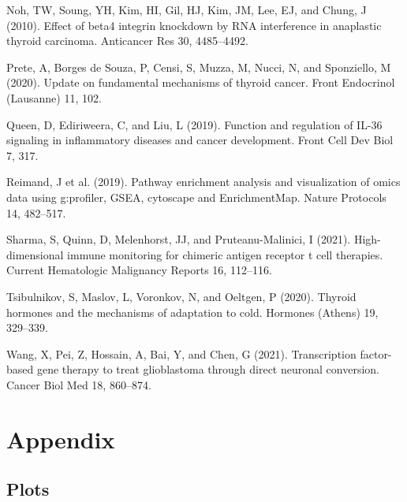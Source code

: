 \documentclass[
  parskip,
  oneside]{scrreprt}
\newlength{\cslhangindent}
\newlength{\cslentryspacingunit} %
\newenvironment{CSLReferences}[2] %
 {%
  \setlength{\parindent}{0pt}
  \ifodd #1
  \let\oldpar\par
  \def\par{\hangindent=\cslhangindent\oldpar}
  \fi
  \setlength{\parskip}{#2\cslentryspacingunit}
 }%
 {}
\begin{document}
\begin{CSLReferences}{0}{0}
\leavevmode{}%
Noh, TW, Soung, YH, Kim, HI, Gil, HJ, Kim, JM, Lee, EJ, and Chung, J
(2010). Effect of {beta}4 integrin knockdown by RNA interference in
anaplastic thyroid carcinoma. Anticancer Res 30, 4485--4492.

\leavevmode{}%
Prete, A, Borges de Souza, P, Censi, S, Muzza, M, Nucci, N, and
Sponziello, M (2020). Update on fundamental mechanisms of thyroid
cancer. Front Endocrinol (Lausanne) 11, 102.

\leavevmode{}%
Queen, D, Ediriweera, C, and Liu, L (2019). Function and regulation of
IL-36 signaling in inflammatory diseases and cancer development. Front
Cell Dev Biol 7, 317.

\leavevmode{}%
Reimand, J et al. (2019). Pathway enrichment analysis and visualization
of omics data using g:profiler, GSEA, cytoscape and EnrichmentMap.
Nature Protocols 14, 482--517.

\leavevmode{}%
Sharma, S, Quinn, D, Melenhorst, JJ, and Pruteanu-Malinici, I (2021).
High-dimensional immune monitoring for chimeric antigen receptor t cell
therapies. Current Hematologic Malignancy Reports 16, 112--116.

\leavevmode{}%
Tsibulnikov, S, Maslov, L, Voronkov, N, and Oeltgen, P (2020). Thyroid
hormones and the mechanisms of adaptation to cold. Hormones (Athens) 19,
329--339.

\leavevmode{}%
Wang, X, Pei, Z, Hossain, A, Bai, Y, and Chen, G (2021). Transcription
factor-based gene therapy to treat glioblastoma through direct neuronal
conversion. Cancer Biol Med 18, 860--874.

\end{CSLReferences}

\hypertarget{appendix}{%
\chapter{Appendix}\label{appendix}}

\hypertarget{plots}{%
\section{Plots}\label{plots}}
\end{document}
